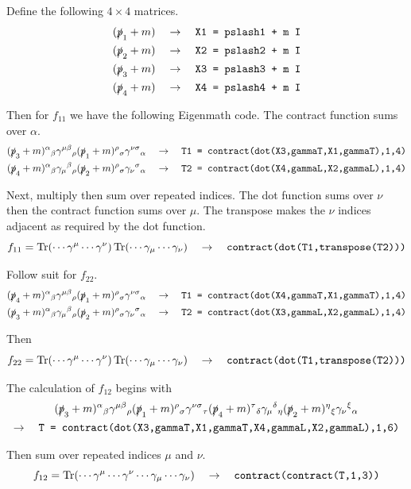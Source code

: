 \documentclass[12pt]{article}
\begin{document}
\noindent
Define the following $4\times4$ matrices.
\begin{align*}
(\slashed{p}_1+m)\quad&\rightarrow\quad\text{\tt X1 = pslash1 + m I}\\
(\slashed{p}_2+m)\quad&\rightarrow\quad\text{\tt X2 = pslash2 + m I}\\
(\slashed{p}_3+m)\quad&\rightarrow\quad\text{\tt X3 = pslash3 + m I}\\
(\slashed{p}_4+m)\quad&\rightarrow\quad\text{\tt X4 = pslash4 + m I}
\end{align*}

\noindent
Then for $f_{11}$ we have the following Eigenmath code.
The contract function sums over $\alpha$.
\begin{align*}
(\slashed{p}_3+m)^\alpha{}_\beta
\gamma^{\mu\beta}{}_\rho
(\slashed{p}_1+m)^\rho{}_\sigma
\gamma^{\nu\sigma}{}_\alpha
\quad&\rightarrow\quad
\text{\tt T1 = contract(dot(X3,gammaT,X1,gammaT),1,4)}
\\
(\slashed{p}_4+m)^\alpha{}_\beta
\gamma_\mu{}^\beta{}_\rho
(\slashed{p}_2+m)^\rho{}_\sigma
\gamma_\nu{}^\sigma{}_\alpha
\quad&\rightarrow\quad
\text{\tt T2 = contract(dot(X4,gammaL,X2,gammaL),1,4)}
\end{align*}

\noindent
Next, multiply then sum over repeated indices.
The dot function sums over $\nu$ then the contract function
sums over $\mu$. The transpose makes the $\nu$ indices adjacent
as required by the dot function.
$$
f_{11}=
\mathop{\rm Tr}(\cdots\gamma^\mu\cdots\gamma^\nu)
\mathop{\rm Tr}(\cdots\gamma_\mu\cdots\gamma_\nu)
\quad\rightarrow\quad
\text{\tt contract(dot(T1,transpose(T2)))}
$$

\noindent
Follow suit for $f_{22}$.
\begin{align*}
(\slashed{p}_4+m)^\alpha{}_\beta
\gamma^{\mu\beta}{}_\rho
(\slashed{p}_1+m)^\rho{}_\sigma
\gamma^{\nu\sigma}{}_\alpha
\quad&\rightarrow\quad
\text{\tt T1 = contract(dot(X4,gammaT,X1,gammaT),1,4)}
\\
(\slashed{p}_3+m)^\alpha{}_\beta
\gamma_\mu{}^\beta{}_\rho
(\slashed{p}_2+m)^\rho{}_\sigma
\gamma_\nu{}^\sigma{}_\alpha
\quad&\rightarrow\quad
\text{\tt T2 = contract(dot(X3,gammaL,X2,gammaL),1,4)}
\end{align*}

\noindent
Then
$$
f_{22}=
\mathop{\rm Tr}(\cdots\gamma^\mu\cdots\gamma^\nu)
\mathop{\rm Tr}(\cdots\gamma_\mu\cdots\gamma_\nu)
\quad\rightarrow\quad
\text{\tt contract(dot(T1,transpose(T2)))}
$$

\noindent
The calculation of $f_{12}$ begins with
\begin{multline*}
(\slashed{p}_3+m)^\alpha{}_\beta
\gamma^{\mu\beta}{}_\rho
(\slashed{p}_1+m)^\rho{}_\sigma
\gamma^{\nu\sigma}{}_\tau
(\slashed{p}_4+m)^\tau{}_\delta
\gamma_\mu{}^\delta{}_\eta
(\slashed{p}_2+m)^\eta{}_\xi
\gamma_\nu{}^\xi{}_\alpha
\\
\rightarrow\quad
\text{\tt T = contract(dot(X3,gammaT,X1,gammaT,X4,gammaL,X2,gammaL),1,6)}
\end{multline*}

\noindent
Then sum over repeated indices $\mu$ and $\nu$.
$$
f_{12}=\mathop{\rm Tr}(\cdots\gamma^\mu\cdots\gamma^\nu\cdots\gamma_\mu\cdots\gamma_\nu)
\quad\rightarrow\quad
\text{\tt contract(contract(T,1,3))}
$$
\end{document}
